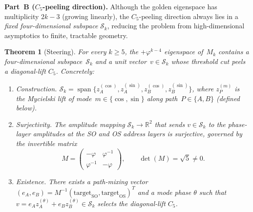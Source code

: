 \documentclass[11pt,a4paper]{amsart}
\theoremstyle{plain}
\newtheorem{theorem}{Theorem}[section]
\theoremstyle{definition}
\theoremstyle{remark}
\newcommand{\R}{\mathbb{R}}
\newcommand{\vp}{\varphi}
\newcommand{\spn}{\operatorname{span}}
\begin{document}
\medskip\noindent
\textbf{Part~B ($C_5$-peeling direction).}
Although the golden eigenspace has multiplicity $2k{-}3$ (growing linearly), the
$C_5$-peeling direction always lies in a \emph{fixed four-dimensional subspace}
$\mathcal{S}_k$, reducing the problem from high-dimensional asymptotics to
finite, tractable geometry.

\begin{theorem}[Steering]\label{thm:steering}
For every $k \geq 5$, the $+\vp^{k-4}$ eigenspace of~$M_k$ contains a
four-dimensional subspace~$\mathcal{S}_k$ and a unit vector~$v \in
\mathcal{S}_k$ whose threshold cut peels a diagonal-lift $C_5$.  Concretely:
\begin{enumerate}[\upshape(i)]
\item \emph{Construction.}  $\mathcal{S}_k =
  \spn\!\bigl\{z_A^{(\cos)}, z_A^{(\sin)},
  z_B^{(\cos)}, z_B^{(\sin)}\bigr\}$,
  where $z_P^{(m)}$ is the Mycielski lift of mode~$m \in \{\cos,\sin\}$ along
  path~$P \in \{A,B\}$ (defined below).
\item \emph{Surjectivity.}  The amplitude mapping
  $\mathcal{S}_k \to \R^2$ that sends $v \in \mathcal{S}_k$ to the phase-layer
  amplitudes at the SO and OS address layers is surjective, governed by
  the invertible matrix
  \[
    M = \begin{pmatrix} -\vp & \vp^{-1} \\ \vp^{-1} & -\vp \end{pmatrix},
    \qquad \det(M) = \sqrt{5} \neq 0.
  \]
\item \emph{Existence.}  There exists a path-mixing vector
  $(e_A, e_B) = M^{-1}(\text{target}_{\mathrm{SO}},
  \text{target}_{\mathrm{OS}})^T$ and a mode phase $\theta$ such that
  $v = e_A z_A^{(\theta)} + e_B z_B^{(\theta)} \in \mathcal{S}_k$
  selects the diagonal-lift $C_5$.
\end{enumerate}
\end{theorem}
\end{document}
